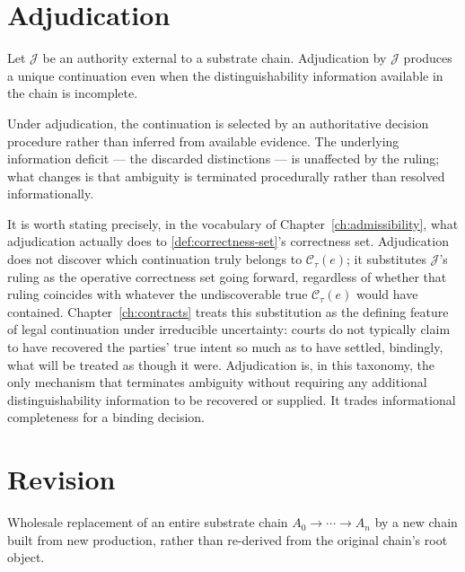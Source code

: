 \section{Adjudication}
\label{sec:coord-adjudication}

\begin{proposition}
\label{prop:adjudication}
Let $\mathcal{J}$ be an authority external to a substrate chain.
Adjudication by $\mathcal{J}$ produces a unique continuation even when the
distinguishability information available in the chain is incomplete.
\end{proposition}

\begin{proofsketch}
Under adjudication, the continuation is selected by an authoritative
decision procedure rather than inferred from available evidence. The
underlying information deficit --- the discarded distinctions --- is
unaffected by the ruling; what changes is that ambiguity is terminated
procedurally rather than resolved informationally.
\end{proofsketch}

It is worth stating precisely, in the vocabulary of
Chapter~\ref{ch:admissibility}, what adjudication actually does to
\cref{def:correctness-set}'s correctness set. Adjudication does not
discover which continuation truly belongs to $\mathcal{C}_\tau(e)$; it
substitutes $\mathcal{J}$'s ruling as the operative correctness set going
forward, regardless of whether that ruling coincides with whatever the
undiscoverable true $\mathcal{C}_\tau(e)$ would have contained.
Chapter~\ref{ch:contracts} treats this substitution as the defining
feature of legal continuation under irreducible uncertainty: courts do
not typically claim to have recovered the parties' true intent so much as
to have settled, bindingly, what will be treated as though it were.
Adjudication is, in this taxonomy, the only mechanism that terminates
ambiguity without requiring any additional distinguishability information
to be recovered or supplied. It trades informational completeness for a
binding decision.

\section{Revision}
\label{sec:coord-revision}

\begin{definition}
\label{def:relay-revision}
Wholesale replacement of an entire substrate chain $A_0 \to \cdots \to
A_n$ by a new chain built from new production, rather than re-derived
from the original chain's root object.
\end{definition}

